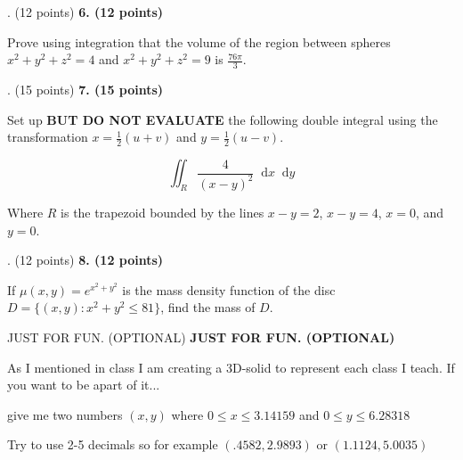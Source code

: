 \documentclass[12pt]{article}
\makeatletter
\newcommand*\dif{\mathop{}\!\mathrm{d}}
\newenvironment{problem}[1][]{%
  \bigskip%
  \noindent\begin{boxedminipage}{\columnwidth}%
  \def\@tempa{#1}%
  \ifx\@tempa\empty\else%
    \textbf{#1}\hspace{0.5em}%
  \fi%
}{%
  \end{boxedminipage}%
}
\makeatother
\begin{document}
\newpage
\begin{problem}[6. (12 points)]
Prove using integration that the volume of the region between spheres $x^2+y^2+z^2=4$ and $x^2+y^2+z^2= 9$ is $\frac{76\pi}{3}$.
\end{problem}


\newpage
\begin{problem}[7. (15 points)]
Set up \textbf{BUT DO NOT EVALUATE} the following double integral using the transformation $x=\frac{1}{2}(u+v)$ and $y= \frac{1}{2}(u-v)$.

\begin{equation*}
\iint_R \frac{4}{(x-y)^2}\dif{x}\dif{y}
\end{equation*}

\vspace{.25cm}

Where $R$ is the trapezoid bounded by the lines $x-y=2$, $x-y=4$, $x=0$, and $y=0$.

\end{problem}


\newpage
\begin{problem}[8. (12 points)]
If $\mu(x,y) = e^{x^2+y^2}$ is the mass density function of the disc $D = \{(x,y): x^2+y^2\leq 81\}$, find the mass of $D$.

\end{problem}

\newpage
\begin{problem}[JUST FOR FUN. (OPTIONAL)]

As I mentioned in class I am creating a 3D-solid to represent each class I teach. If you want to be apart of it...

\begin{center}
give me two numbers $(x,y)$ where $0\leq x\leq 3.14159$ and $0\leq y \leq 6.28318$
\end{center}

Try to use 2-5 decimals so for example $(.4582, 2.9893)$ or $(1.1124, 5.0035)$

\end{problem}
\end{document}

